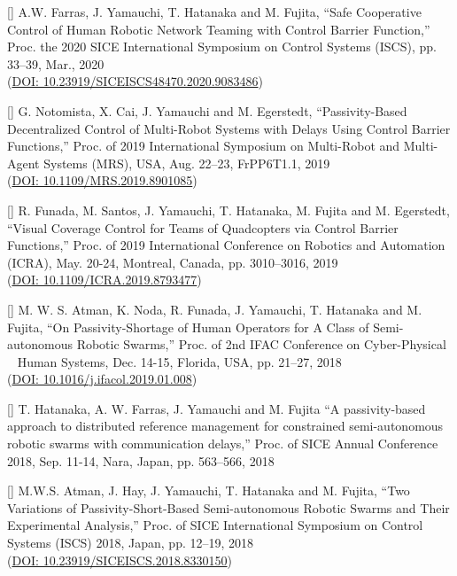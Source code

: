 \documentclass[letterpaper]{article}
\newcounter{conf}
\begin{document}
[]  
  A.W. Farras, J. Yamauchi, T. Hatanaka and M. Fujita,
  ``Safe Cooperative Control of Human Robotic Network Teaming with Control Barrier Function,''
  Proc. the 2020 SICE International Symposium on Control Systems (ISCS),  pp. 33--39, Mar., 2020 \\ 
  (\href{https://ieeexplore.ieee.org/document/9083486}{DOI: 10.23919/SICEISCS48470.2020.9083486}) \\
\addtocounter{conf}{-1}

[]  
  G. Notomista, X. Cai, J. Yamauchi and M. Egerstedt,
  ``Passivity-Based Decentralized Control of Multi-Robot Systems with Delays Using Control Barrier Functions,''
  Proc. of 2019 International Symposium on Multi-Robot and Multi-Agent Systems (MRS), USA, Aug. 22--23, FrPP6T1.1, 2019 \\ 
  (\href{https://ieeexplore.ieee.org/document/8901085}{DOI: 10.1109/MRS.2019.8901085}) \\
\addtocounter{conf}{-1}

[] 
  R. Funada, M. Santos, J. Yamauchi, T. Hatanaka, M. Fujita and M. Egerstedt,
  ``Visual Coverage Control for Teams of Quadcopters via Control Barrier Functions,''
  Proc. of 2019 International Conference on Robotics and Automation (ICRA), May. 20-24, Montreal, Canada, pp. 3010--3016, 2019 \\
  (\href{https://ieeexplore.ieee.org/document/8793477}{DOI: 10.1109/ICRA.2019.8793477}) \\
\addtocounter{conf}{-1}

[]  
  M. W. S. Atman, K. Noda, R. Funada, J. Yamauchi, T. Hatanaka and M. Fujita,
  ``On Passivity-Shortage of Human Operators for A Class of Semi-autonomous Robotic Swarms,''
  Proc. of 2nd IFAC Conference on Cyber-Physical ~ Human Systems, Dec. 14-15, Florida, USA, pp. 21--27, 2018 \\
  (\href{https://doi.org/10.1016/j.ifacol.2019.01.008}{DOI: 10.1016/j.ifacol.2019.01.008}) \\
\addtocounter{conf}{-1}

[]  
  T. Hatanaka, A. W. Farras, J. Yamauchi and M. Fujita
  ``A passivity-based approach to distributed reference management for constrained semi-autonomous robotic swarms with communication delays,''
  Proc. of SICE Annual Conference 2018, Sep. 11-14, Nara, Japan, pp. 563--566, 2018 \\
\addtocounter{conf}{-1}

[] 
  M.W.S. Atman, J. Hay, J. Yamauchi, T. Hatanaka and M. Fujita,
  ``Two Variations of Passivity-Short-Based Semi-autonomous Robotic Swarms and Their Experimental Analysis,''
  Proc. of SICE International Symposium on Control Systems (ISCS) 2018, Japan, pp. 12--19, 2018 \\
  (\href{http://ieeexplore.ieee.org/document/8330150/}{DOI: 10.23919/SICEISCS.2018.8330150}) \\
\addtocounter{conf}{-1}
\end{document}
